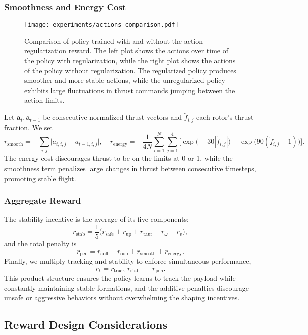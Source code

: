 \subsubsection{Smoothness and Energy Cost}
\begin{figure}[ht]
    \centering
    
    \texttt{[image: experiments/actions\_comparison.pdf]}
    \caption{Comparison of policy trained with and without the action regularization reward. The left plot shows the actions over time of the policy with regularization, while the right plot shows the actions of the policy without regularization. The regularized policy produces smoother and more stable actions, while the unregularized policy exhibits large fluctuations in thrust commands jumping between the action limits.}
    \label{fig:}
\end{figure}
Let \(\mathbf{a}_t,\mathbf{a}_{t-1}\) be consecutive normalized thrust vectors and \(\tilde f_{i,j}\) each rotor's thrust fraction.  We set
\[
r_{\mathrm{smooth}}
= -\sum_{i,j} \bigl|a_{t,i,j}-a_{t-1,i,j}\bigr|,
\quad
r_{\mathrm{energy}}
= -\frac{1}{4N}\sum_{i=1}^N\sum_{j=1}^4\bigl[\exp\bigl(-30|\tilde f_{i,j}|\bigr)+\exp\bigl(90(\tilde f_{i,j}-1)\bigr)\bigr].
\]
The energy cost discourages thrust to be on the limits at 0 or 1, while the smoothness term penalizes large changes in thrust between consecutive timesteps, promoting stable flight.
\subsubsection{Aggregate Reward}
The stability incentive is the average of its five components:
\[
r_{\mathrm{stab}}
= \frac{1}{5}\bigl(r_{\mathrm{safe}} + r_{\mathrm{up}} + r_{\mathrm{taut}} + r_{\omega} + r_{v}\bigr),
\]
and the total penalty is
\[
r_{\mathrm{pen}}
= r_{\mathrm{coll}} + r_{\mathrm{oob}} + r_{\mathrm{smooth}} + r_{\mathrm{energy}}.
\]
Finally, we multiply tracking and stability to enforce simultaneous performance,
\[
r_t
= r_{\mathrm{track}}\;r_{\mathrm{stab}}
\;+\;r_{\mathrm{pen}}.
\]
This product structure ensures the policy learns to track the payload while constantly maintaining stable formations, and the additive penalties discourage unsafe or aggressive behaviors without overwhelming the shaping incentives.

\subsection{Reward Design Considerations}
